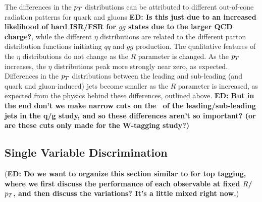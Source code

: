 The differences in the $p_T$ distributions can be attributed to different out-of-cone radiation
patterns for quark and gluons {\bf ED: Is this just due to an increased likelihood of hard ISR/FSR for $gg$ states due to the larger QCD charge?}, while the different $\eta$ distributions are related to the different
parton distribution functions initiating $qq$ and $gg$ production. The qualitative features of the 
$\eta$ distributions do not change as the $R$ parameter is changed. As the $p_T$ increases, 
the $\eta$ distributions peak more strongly near zero, as expected. Differences in the $p_T$ distributions 
between the leading and sub-leading (and quark and gluon-induced) jets become smaller as the 
$R$ parameter is increased, as expected from the physics behind these differences, outlined above. 
{\bf ED: But in the end don't we make narrow cuts on the \pt~of the
  leading/sub-leading jets in the q/g study, and so these differences
  aren't so important? (or are these cuts only made for the W-tagging study?)}

\subsection{Single Variable Discrimination}

({\bf ED: Do we want to organize this section similar to for top tagging, where we first discuss the performance of each observable at fixed $R$/$p_T$, and then discuss the variations? It's a little mixed right now.})

